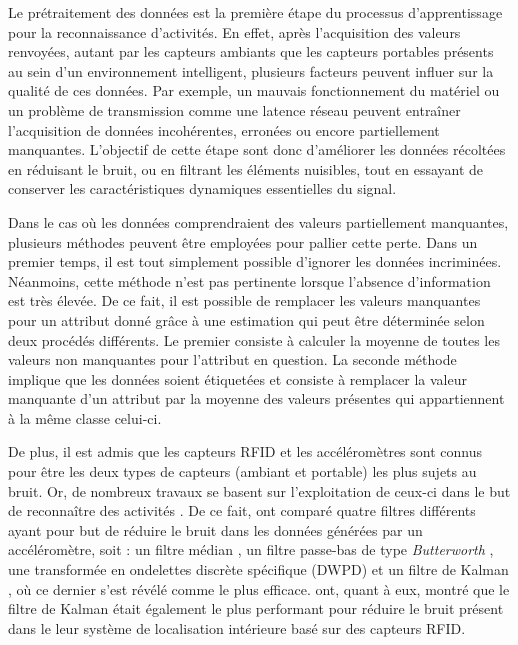 Le prétraitement des données est la première étape du processus d'apprentissage pour la reconnaissance d'activités. En effet, après l'acquisition des valeurs renvoyées, autant par les capteurs ambiants que les capteurs portables présents au sein d'un environnement intelligent, plusieurs facteurs peuvent influer sur la qualité de ces données. Par exemple, un mauvais fonctionnement du matériel ou un problème de transmission comme une latence réseau peuvent entraîner l'acquisition de données incohérentes, erronées ou encore partiellement manquantes. L'objectif de cette étape sont donc d'améliorer les données récoltées en réduisant le bruit, ou en filtrant les éléments nuisibles, tout en essayant de conserver les caractéristiques dynamiques essentielles du signal.

Dans le cas où les données comprendraient des valeurs partiellement manquantes, plusieurs méthodes peuvent être employées pour pallier cette perte. Dans un premier temps, il est tout simplement possible d'ignorer les données incriminées. Néanmoins, cette méthode n'est pas pertinente lorsque l'absence d'information est très élevée. De ce fait, il est possible de remplacer les valeurs manquantes pour un attribut donné grâce à une estimation qui peut être déterminée selon deux procédés différents. Le premier consiste à calculer la moyenne de toutes les valeurs non manquantes pour l'attribut en question. La seconde méthode implique que les données soient étiquetées et consiste à remplacer la valeur manquante d'un attribut par la moyenne des valeurs présentes qui appartiennent à la même classe celui-ci.

De plus, il est admis que les capteurs \ac{RFID} et les accéléromètres sont connus pour être les deux types de capteurs (ambiant et portable) les plus sujets au bruit. Or, de nombreux travaux se basent sur l'exploitation de ceux-ci dans le but de reconnaître des activités \citep{Ravi2005, Stikic2008, Buettner2009, Khan2011, Mannini2017}. De ce fait, \cite{Wang2011} ont comparé quatre filtres différents ayant pour but de réduire le bruit dans les données générées par un accéléromètre, soit : un filtre médian \citep{Huang1979}, un filtre passe-bas de type \textit{Butterworth} \citep{Butterworth1930}, une transformée en ondelettes discrète spécifique (\ac{DWPD}) \citep{Mallat1989} et un filtre de Kalman \citep{Welch2006}, où ce dernier s'est révélé comme le plus efficace. \cite{Abreu2014} ont, quant à eux, montré que le filtre de Kalman était également le plus performant pour réduire le bruit présent dans le leur système de localisation intérieure basé sur des capteurs \acs{RFID}.

